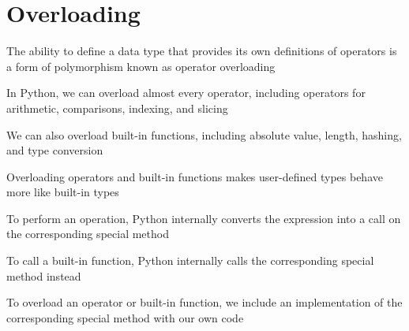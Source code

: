 \documentclass[8pt,a4paper,compress]{beamer}
\begin{document}
\section{Overloading}
\begin{frame}[fragile]
\pause

The ability to define a data type that provides its own definitions of operators is a form of polymorphism known as operator overloading

\pause
\bigskip

In Python, we can overload almost every operator, including operators for arithmetic, comparisons, indexing, and slicing

\pause
\bigskip

We can also overload built-in functions, including absolute value, length, hashing, and type conversion

\pause
\bigskip

Overloading operators and built-in functions makes user-defined types behave more like built-in types

\pause
\bigskip

To perform an operation, Python internally converts the expression into a call on the corresponding special method

\pause
\bigskip

To call a built-in function, Python internally calls the corresponding special method instead

\pause
\bigskip

To overload an operator or built-in function, we include an implementation of the corresponding special method with our own code
\end{frame}
\end{document}
